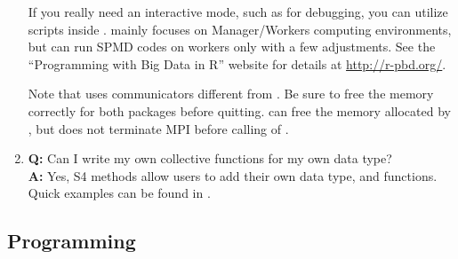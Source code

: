 \begin{enumerate}
      If you really need an interactive mode, such as for debugging,
      you can utilize  scripts inside
      .  mainly focuses on Manager/Workers
      computing environments, but can run SPMD codes on workers only
      with a few adjustments. See the ``Programming with Big Data in R''
      website for details at \url{http://r-pbd.org/}.

      Note that  uses communicators different from
      .  Be sure to free the memory correctly for both
      packages before quitting. 
      can free the memory allocated by , but does not
      terminate MPI before calling  of .

\item {\bf\color{blue} Q:}
      Can I write my own collective functions for my own data type? \\
      {\bf\color{blue} A:}
      Yes, S4 methods allow users to add their own data type, and functions.
      Quick examples can be found in .
\end{enumerate}


\subsection[Programming]{Programming}
\label{sec:programming}


